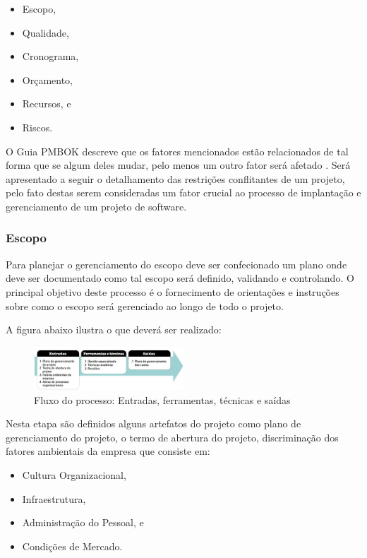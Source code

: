 \documentclass{acm_proc_article-sp}
\begin{document}
\begin{itemize}
\item Escopo,
\item Qualidade,
\item Cronograma,
\item Orçamento,
\item Recursos, e 
\item Riscos.
\end{itemize}


O Guia PMBOK descreve que os fatores mencionados estão relacionados de tal forma que se algum deles mudar, pelo menos um outro fator será afetado \cite{pmbok:nAgil}. Será apresentado a seguir o detalhamento das restrições conflitantes de um projeto, pelo fato destas serem consideradas um fator crucial ao processo de implantação e gerenciamento de um projeto de software.  

\subsubsection*{Escopo}
Para planejar o gerenciamento do escopo deve ser confecionado um plano onde deve ser documentado como tal escopo será definido, validando e controlando. O principal objetivo deste processo é o fornecimento de orientações e instruções sobre como o escopo será gerenciado ao longo de todo o projeto.

A figura abaixo ilustra o que deverá ser realizado:

\begin{figure}[h]
\centering %
\includegraphics[width=0.5\textwidth]{entradaescopo.jpg} %
\caption{Fluxo do processo: Entradas, ferramentas, técnicas e saídas \cite{pmbok:nAgil}}
\end{figure}

Nesta etapa são definidos alguns artefatos do projeto como plano de gerenciamento do projeto, o termo de abertura do projeto, discriminação dos fatores ambientais da empresa que consiste em:

\begin{itemize}
\item Cultura Organizacional,
\item Infraestrutura,
\item Administração do Pessoal, e
\item Condições de Mercado.
\end{itemize} 
\end{document}
